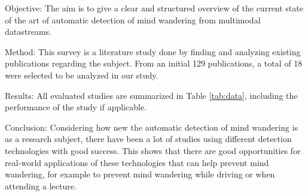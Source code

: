 Objective: The aim is to give a clear and structured overview of the current state of the art of automatic detection of mind wandering from multimodal datastreams.

Method: This survey is a literature study done by finding and analyzing existing publications regarding the subject. From an initial 129 publications, a total of 18 were selected to be analyzed in our study.

Results: All evaluated studies are summarized in Table \ref{tab:data}, including the performance of the study if applicable.

Conclusion: Considering how new the automatic detection of mind wandering is as a research subject, there have been a lot of studies using different detection technologies with good success. This shows that there are good opportunities for real-world applications of these technologies that can help prevent mind wandering, for example to prevent mind wandering while driving or when attending a lecture.